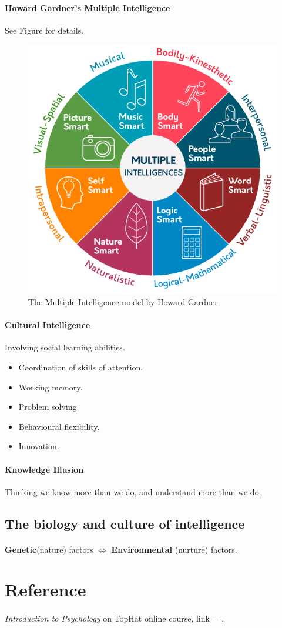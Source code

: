 \documentclass{article}
\begin{document}
	\paragraph{Howard Gardner's Multiple Intelligence} See Figure for details.
	\begin{figure}[H][h]
		\centering
		\includegraphics[width = \linewidth]{pic/multiple_intelligences}
		\caption{The Multiple Intelligence model by Howard Gardner}	
	\end{figure}
	\paragraph{Cultural Intelligence} Involving social learning abilities.
	\begin{itemize}
		\item Coordination of skills of attention.
		\item Working memory.
		\item Problem solving.
		\item Behavioural flexibility.
		\item Innovation.
	\end{itemize}
	\paragraph{Knowledge Illusion} Thinking we know more than we do, and understand more than we do.
	\subsection{The biology and culture of intelligence}
	\paragraph{} \textbf{Genetic}(nature) factors $\iff$ \textbf{Environmental} (nurture) factors.
	\section{Reference}
	\paragraph{} \emph{Introduction to Psychology} on TopHat online course, link = .
\end{document}
